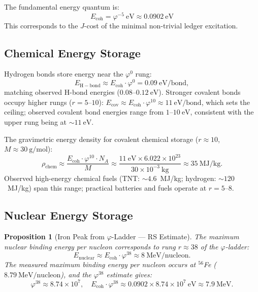 \documentclass[12pt,a4paper]{article}
\newtheorem{proposition}[theorem]{Proposition}
\theoremstyle{definition}
\theoremstyle{remark}
\begin{document}
The fundamental energy quantum is:
\begin{equation}
E_\mathrm{coh} = \varphi^{-5}~\mathrm{eV} \approx 0.0902~\mathrm{eV}
\end{equation}
This corresponds to the $J$-cost of the minimal non-trivial ledger excitation.

\subsection{Chemical Energy Storage}

Hydrogen bonds store energy near the $\varphi^0$ rung:
\begin{equation}
E_\mathrm{H-bond} \approx E_\mathrm{coh} \cdot \varphi^0 = 0.09~\mathrm{eV/bond},
\end{equation}
matching observed H-bond energies ($0.08$--$0.12~\mathrm{eV}$).  Stronger covalent bonds occupy higher rungs ($r = 5$--$10$):
$E_\mathrm{cov} \approx E_\mathrm{coh} \cdot \varphi^{10} \approx
11~\mathrm{eV/bond}$, which sets the ceiling; observed covalent bond
energies range from $1$--$10~\mathrm{eV}$, consistent with the
upper rung being at $\sim 11~\mathrm{eV}$.

The gravimetric energy density for covalent chemical storage ($r \approx 10$,
$M \approx 30~\mathrm{g/mol}$):
\begin{equation}
\rho_\mathrm{chem} \approx \frac{E_\mathrm{coh} \cdot \varphi^{10} \cdot N_A}{M}
\approx \frac{11~\mathrm{eV} \times 6.022 \times 10^{23}}{30 \times 10^{-3}~\mathrm{kg}}
\approx 35~\mathrm{MJ/kg}.
\end{equation}
Observed high-energy chemical fuels (TNT: $\sim 4.6$~MJ/kg; hydrogen: $\sim 120$~MJ/kg)
span this range; practical batteries and fuels operate at $r = 5$--$8$.

\subsection{Nuclear Energy Storage}

\begin{proposition}[Iron Peak from $\varphi$-Ladder --- RS Estimate]
\label{prop:iron-peak}
The maximum nuclear binding energy per nucleon corresponds to
rung $r \approx 38$ of the $\varphi$-ladder:
\begin{equation}
E_\mathrm{nuclear} \approx E_\mathrm{coh} \cdot \varphi^{38} \approx 8~\mathrm{MeV/nucleon}.
\end{equation}
The measured maximum binding energy per nucleon occurs at $^{56}$Fe
($8.79~\mathrm{MeV/nucleon}$), and the $\varphi^{38}$ estimate gives:
\begin{equation}
\varphi^{38} \approx 8.74 \times 10^{7}, \quad
E_\mathrm{coh} \cdot \varphi^{38} \approx 0.0902 \times 8.74 \times 10^{7}~\mathrm{eV}
\approx 7.9~\mathrm{MeV}.
\end{equation}
\end{proposition}
\end{document}
